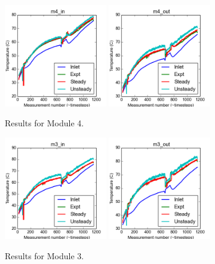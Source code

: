 \documentclass{article}
\begin{document}
\clearpage
\begin{figure}[!ht]
\centering
\includegraphics[width=0.4\textwidth]{../../data/ICSolar/images/Jan28_m4_in_compare.png}\hspace{0.05\textwidth}
\includegraphics[width=0.4\textwidth]{../../data/ICSolar/images/Jan28_m4_out_compare.png}\hspace{0.05\textwidth}\\
\caption{Results for Module 4.}\end{figure}
\begin{figure}[!ht]
\centering
\includegraphics[width=0.4\textwidth]{../../data/ICSolar/images/Jan28_m3_in_compare.png}\hspace{0.05\textwidth}
\includegraphics[width=0.4\textwidth]{../../data/ICSolar/images/Jan28_m3_out_compare.png}\hspace{0.05\textwidth}\\
\caption{Results for Module 3.}\end{figure}
\end{document}
